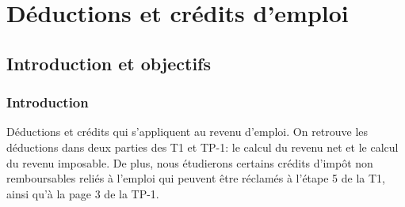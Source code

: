 \chapter{Déductions et crédits d'emploi}
\section{Introduction et objectifs}
\subsection{Introduction}
Déductions et crédits qui s'appliquent au revenu d'emploi. On retrouve les déductions dans deux parties des T1 et TP-1: le calcul du revenu net et le calcul du  revenu imposable. De plus, nous étudierons certains crédits d'impôt non remboursables reliés à l'emploi qui peuvent être réclamés à l'étape 5 de la T1, ainsi qu'à la page 3 de la TP-1.


